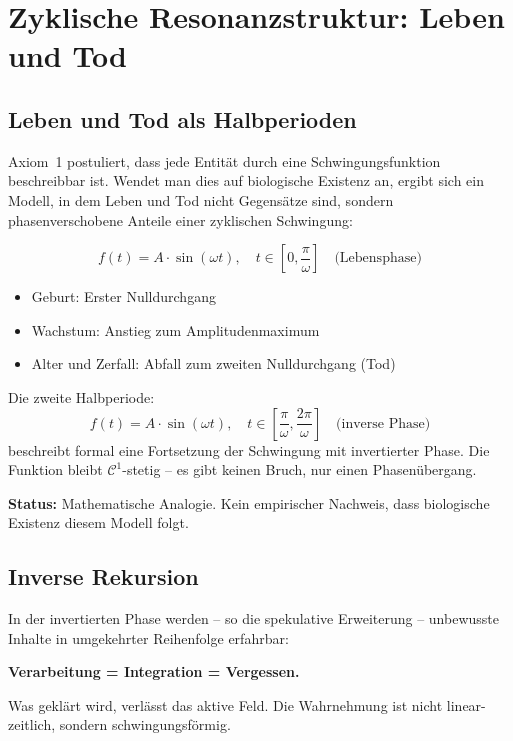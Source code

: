 \documentclass[a4paper,11pt]{article}
\begin{document}
	\section{Zyklische Resonanzstruktur: Leben und Tod}
	
	\subsection{Leben und Tod als Halbperioden}
	
	Axiom~1 postuliert, dass jede Entit\"at durch eine
	Schwingungsfunktion beschreibbar ist. Wendet man dies
	auf biologische Existenz an, ergibt sich ein Modell,
	in dem Leben und Tod nicht Gegens\"atze sind, sondern
	phasenverschobene Anteile einer zyklischen Schwingung:
	
	\[
	f(t) = A \cdot \sin(\omega t), \quad
	t \in \left[0, \frac{\pi}{\omega}\right]
	\quad \text{(Lebensphase)}
	\]
	\begin{itemize}
		\item Geburt: Erster Nulldurchgang
		\item Wachstum: Anstieg zum Amplitudenmaximum
		\item Alter und Zerfall: Abfall zum zweiten Nulldurchgang
		(Tod)
	\end{itemize}
	
	Die zweite Halbperiode:
	\[
	f(t) = A \cdot \sin(\omega t), \quad
	t \in \left[\frac{\pi}{\omega},
	\frac{2\pi}{\omega}\right]
	\quad \text{(inverse Phase)}
	\]
	beschreibt formal eine Fortsetzung der Schwingung mit
	invertierter Phase. Die Funktion bleibt $\mathcal{C}^1$-stetig
	-- es gibt keinen Bruch, nur einen Phasen\"ubergang.
	
	\textbf{Status:} Mathematische Analogie. Kein empirischer
	Nachweis, dass biologische Existenz diesem Modell folgt.
	
	\subsection{Inverse Rekursion}
	
	In der invertierten Phase werden -- so die spekulative
	Erweiterung -- unbewusste Inhalte in umgekehrter
	Reihenfolge erfahrbar:
	
	\textbf{Verarbeitung = Integration = Vergessen.}
	
	Was gekl\"art wird, verl\"asst das aktive Feld. Die
	Wahrnehmung ist nicht linear-zeitlich, sondern
	schwingungsf\"ormig.
	
\end{document}
